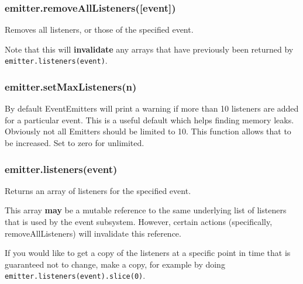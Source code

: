 \subsubsection{emitter.removeAllListeners({[}event{]})}

Removes all listeners, or those of the specified event.

Note that this will \textbf{invalidate} any arrays that have previously
been returned by \texttt{emitter.listeners(event)}.

\subsubsection{emitter.setMaxListeners(n)}

By default EventEmitters will print a warning if more than 10 listeners
are added for a particular event. This is a useful default which helps
finding memory leaks. Obviously not all Emitters should be limited to
10. This function allows that to be increased. Set to zero for
unlimited.

\subsubsection{emitter.listeners(event)}

Returns an array of listeners for the specified event.

\begin{Shaded}
\begin{Highlighting}[]
\NormalTok{(}\NormalTok{, } 
  \NormalTok{(}\NormalTok{);}
\NormalTok{\});}
\NormalTok{(}\NormalTok{(}\NormalTok{(}\NormalTok{))); }\CommentTok{// [ [Function] ]}
\end{Highlighting}
\end{Shaded}

This array \textbf{may} be a mutable reference to the same underlying
list of listeners that is used by the event subsystem. However, certain
actions (specifically, removeAllListeners) will invalidate this
reference.

If you would like to get a copy of the listeners at a specific point in
time that is guaranteed not to change, make a copy, for example by doing
\texttt{emitter.listeners(event).slice(0)}.

